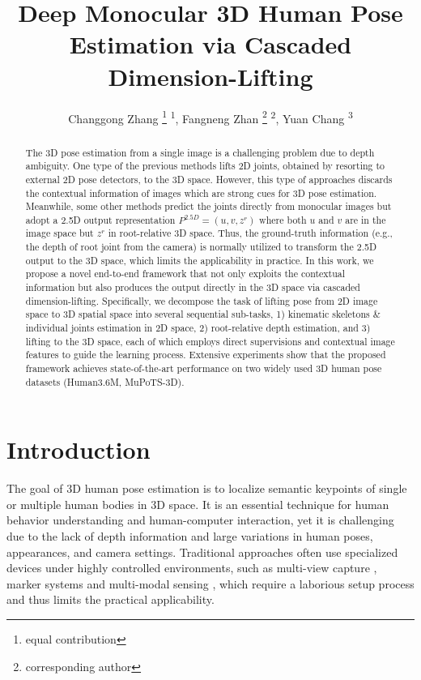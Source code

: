 \documentclass[letterpaper]{article} \usepackage{aaai21}  \usepackage{times}  \usepackage{helvet} \usepackage{courier}  \usepackage[hyphens]{url}  \usepackage{graphicx} \urlstyle{rm} \def\UrlFont{\rm}  \usepackage{natbib}  \usepackage{caption} \frenchspacing  \setlength{\pdfpagewidth}{8.5in}  \setlength{\pdfpageheight}{11in}
\title{Deep Monocular 3D Human Pose Estimation via Cascaded Dimension-Lifting}
\author {
Changgong Zhang  \thanks{equal contribution} \textsuperscript{\rm 1},
Fangneng Zhan \footnotemark[1] \thanks{corresponding author} \textsuperscript{\rm 2},
Yuan Chang  \textsuperscript{\rm 3} \\
}
\begin{document}
\maketitle

\begin{abstract}

The 3D pose estimation from a single image is a challenging problem due to depth ambiguity. One type of the previous methods lifts 2D joints, obtained by resorting to external 2D pose detectors, to the 3D space. However, this type of approaches discards the contextual information of images which are strong cues for 3D pose estimation. Meanwhile, some other methods predict the joints directly from monocular images but adopt a 2.5D output representation $P^{2.5D} = (u,v,z^{r}) $ where both $u$ and $v$ are in the image space but $z^{r}$ in root-relative 3D space. Thus, the ground-truth information (e.g., the depth of root joint from the camera) is normally utilized to transform the 2.5D output to the 3D space, which limits the applicability in practice. In this work, we propose a novel end-to-end framework that not only exploits the contextual information but also produces the output directly in the 3D space via cascaded dimension-lifting. Specifically, we decompose the task of lifting pose from 2D image space to 3D spatial space into several sequential sub-tasks, 1) kinematic skeletons \& individual joints estimation in 2D space, 2) root-relative depth estimation, and 3) lifting to the 3D space, each of which employs direct supervisions and contextual image features to guide the learning process. Extensive experiments show that the proposed framework achieves state-of-the-art performance on two widely used 3D human pose datasets (Human3.6M, MuPoTS-3D).
\end{abstract}

\section{Introduction}
The goal of 3D human pose estimation is to localize semantic keypoints of single or multiple human bodies in 3D space. It is an essential technique for human behavior understanding and human-computer interaction, yet it is challenging due to the lack of depth information and large variations in human poses, appearances, and camera settings. Traditional approaches often use specialized devices under highly controlled environments, such as multi-view capture \cite{amin2013multi}, marker systems \cite{mandery2015kit} and multi-modal sensing \cite{palmero2016multi}, which require a laborious setup process and thus limits the practical applicability.
\end{document}
